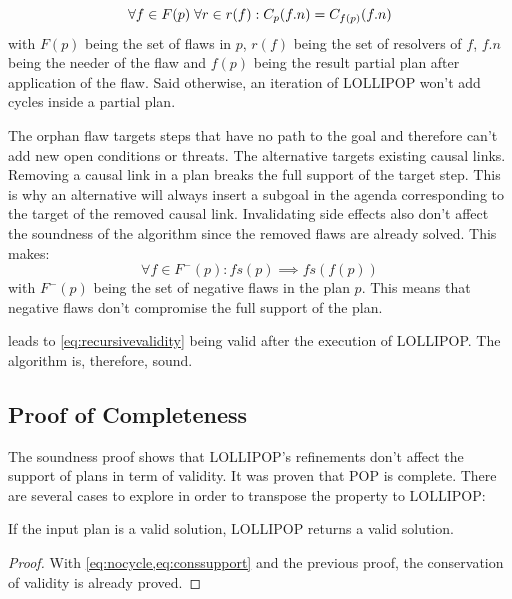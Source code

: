 \begin{equation}\forall f \in F(p) \thickspace \forall r \in r(f): C_p(f.n) = C_{f(p)}(f.n)\label{eq:nocycle}\end{equation}
with \(F(p)\) being the set of flaws in \(p\), \(r(f)\) being the set of
resolvers of \(f\), \(f.n\) being the needer of the flaw and \(f(p)\)
being the result partial plan after application of the flaw. Said
otherwise, an iteration of LOLLIPOP won't add cycles inside a partial
plan.

The orphan flaw targets steps that have no path to the goal and
therefore can't add new open conditions or threats. The alternative
targets existing causal links. Removing a causal link in a plan breaks
the full support of the target step. This is why an alternative will
always insert a subgoal in the agenda corresponding to the target of the
removed causal link. Invalidating side effects also don't affect the
soundness of the algorithm since the removed flaws are already solved.
This makes: \begin{equation}
\forall f \in F^-(p): fs(p) \implies fs(f(p))
\label{eq:conssupport}\end{equation} with \(F^-(p)\) being the set of
negative flaws in the plan \(p\). This means that negative flaws don't
compromise the full support of the plan.

 leads to \cref{eq:recursivevalidity}
being valid after the execution of LOLLIPOP. The algorithm is,
therefore, sound.

\subsection{Proof of Completeness}\label{proof-of-completeness}

The soundness proof shows that LOLLIPOP's refinements don't affect the
support of plans in term of validity. It was proven that POP is
complete. There are several cases to explore in order to transpose the
property to LOLLIPOP:

\begin{lemma}

If the input plan is a valid solution, LOLLIPOP returns a valid
solution.

\end{lemma}

\begin{proof}

With \cref{eq:nocycle,eq:conssupport} and the previous proof, the
conservation of validity is already proved. \qedhere

\end{proof}

